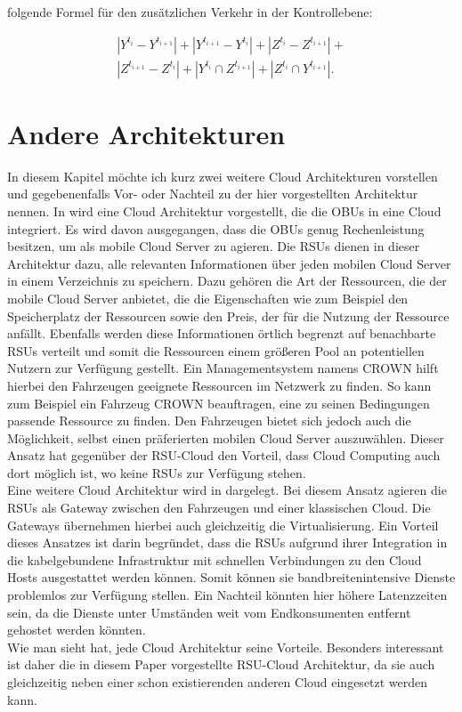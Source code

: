 \documentclass[conference]{IEEEtran}
\begin{document}
folgende Formel für den zusätzlichen Verkehr in der Kontrollebene: 

\begin{equation}
\begin{split}
 |Y^{t_i}-Y^{t_{i+1}}|+|Y^{t_{i+1}}-Y^{t_{i}}|+|Z^{t_i}-Z^{t_{i+1}}|+ \\|Z^{t_{i+1}}-Z^{t_{i}}|+|Y^{t_i} \cap Z^{t_{i+1}}|+|Z^{t_{i}} \cap Y^{t_{i+1}}|.
 \end{split}
\end{equation}


\section{Andere Architekturen}

In diesem Kapitel möchte ich kurz zwei weitere Cloud Architekturen vorstellen und gegebenenfalls Vor- oder Nachteil zu der hier vorgestellten Architektur nennen. In \cite{IEEEhowto:star} wird eine Cloud Architektur vorgestellt, die die OBUs in eine Cloud integriert. Es wird davon ausgegangen, dass die OBUs genug Rechenleistung besitzen, um als mobile Cloud Server zu agieren. Die RSUs dienen in dieser Architektur dazu, alle relevanten Informationen über jeden mobilen Cloud Server in einem Verzeichnis zu speichern. Dazu gehören die Art der Ressourcen, die der mobile Cloud Server anbietet, die die Eigenschaften wie zum Beispiel den Speicherplatz der Ressourcen sowie den Preis, der für die Nutzung der Ressource anfällt. Ebenfalls werden diese Informationen örtlich begrenzt auf benachbarte RSUs verteilt und somit die Ressourcen einem größeren Pool an potentiellen Nutzern zur Verfügung gestellt. Ein Managementsystem namens CROWN hilft hierbei den Fahrzeugen geeignete Ressourcen im Netzwerk zu finden. So kann zum Beispiel ein Fahrzeug CROWN beauftragen, eine zu seinen Bedingungen passende Ressource zu finden. Den Fahrzeugen bietet sich jedoch auch die Möglichkeit, selbst einen präferierten mobilen Cloud Server auszuwählen. Dieser Ansatz hat gegenüber der RSU-Cloud den Vorteil, dass Cloud Computing auch dort möglich ist, wo keine RSUs zur Verfügung stehen.\\
Eine weitere Cloud Architektur wird in \cite{IEEEhowto:rethinking} dargelegt. Bei diesem Ansatz agieren die RSUs als Gateway zwischen den Fahrzeugen und einer klassischen Cloud. Die Gateways übernehmen hierbei auch gleichzeitig die Virtualisierung. Ein Vorteil dieses Ansatzes ist darin begründet, dass die RSUs aufgrund ihrer Integration in die kabelgebundene Infrastruktur mit schnellen Verbindungen zu den Cloud Hosts ausgestattet werden können. Somit können sie bandbreitenintensive Dienste problemlos zur Verfügung stellen. Ein Nachteil könnten hier höhere Latenzzeiten sein, da die Dienste unter Umständen weit vom Endkonsumenten entfernt gehostet werden könnten. \\
Wie man sieht hat, jede Cloud Architektur seine Vorteile. Besonders interessant ist daher die in diesem Paper vorgestellte RSU-Cloud Architektur, da sie auch gleichzeitig neben einer schon existierenden anderen Cloud eingesetzt werden kann. 
\end{document}
